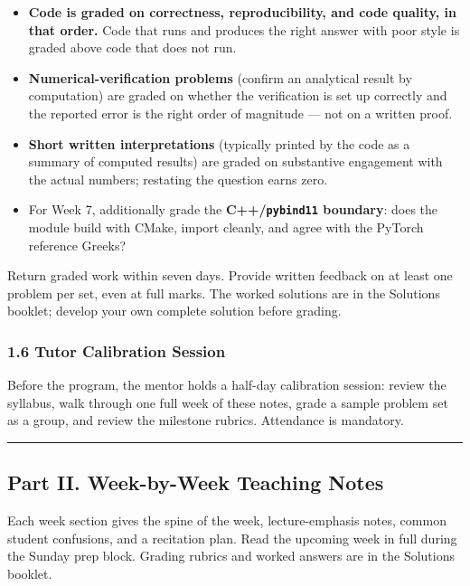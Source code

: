 \documentclass[
]{article}
\providecommand{\tightlist}{%
  \setlength{\itemsep}{0pt}\setlength{\parskip}{0pt}}
\begin{document}
\begin{itemize}
\tightlist
\item
  \textbf{Code is graded on correctness, reproducibility, and code
  quality, in that order.} Code that runs and produces the right answer
  with poor style is graded above code that does not run.
\item
  \textbf{Numerical-verification problems} (confirm an analytical result
  by computation) are graded on whether the verification is set up
  correctly and the reported error is the right order of magnitude ---
  not on a written proof.
\item
  \textbf{Short written interpretations} (typically printed by the code
  as a summary of computed results) are graded on substantive engagement
  with the actual numbers; restating the question earns zero.
\item
  For Week 7, additionally grade the \textbf{C++/\texttt{pybind11}
  boundary}: does the module build with CMake, import cleanly, and agree
  with the PyTorch reference Greeks?
\end{itemize}

Return graded work within seven days. Provide written feedback on at
least one problem per set, even at full marks. The worked solutions are
in the Solutions booklet; develop your own complete solution before
grading.

\subsubsection{1.6 Tutor Calibration
Session}\label{tutor-calibration-session}

Before the program, the mentor holds a half-day calibration session:
review the syllabus, walk through one full week of these notes, grade a
sample problem set as a group, and review the milestone rubrics.
Attendance is mandatory.

\begin{center}\rule{0.5\linewidth}{0.5pt}\end{center}

\subsection{Part II. Week-by-Week Teaching
Notes}\label{part-ii.-week-by-week-teaching-notes}

Each week section gives the spine of the week, lecture-emphasis notes,
common student confusions, and a recitation plan. Read the upcoming week
in full during the Sunday prep block. Grading rubrics and worked answers
are in the Solutions booklet.
\end{document}
